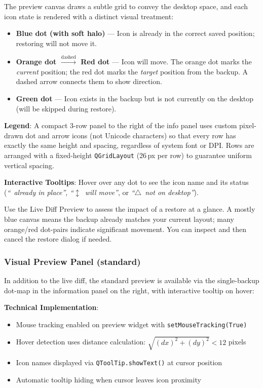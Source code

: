 \documentclass[a4paper,11pt]{article}
\begin{document}
The preview canvas draws a subtle grid to convey the desktop space,
and each icon state is rendered with a distinct visual treatment:

\begin{itemize}
  \item \textbf{\textcolor{primary}{Blue dot} (with soft halo)} ---
    Icon is already in the correct saved position; restoring will not move it.
  \item \textbf{Orange dot $\xrightarrow{\text{dashed}}$ Red dot} ---
    Icon will move.  The orange dot marks the \textit{current} position;
    the red dot marks the \textit{target} position from the backup.
    A dashed arrow connects them to show direction.
  \item \textbf{\textcolor{success}{Green dot}} ---
    Icon exists in the backup but is not currently on the desktop
    (will be skipped during restore).
\end{itemize}

\textbf{Legend}: A compact 3-row panel to the right of the info panel
uses custom pixel-drawn dot and arrow icons (not Unicode characters) so
that every row has exactly the same height and spacing, regardless of
system font or DPI.  Rows are arranged with a fixed-height
\texttt{QGridLayout} (26\,px per row) to guarantee uniform vertical
spacing.

\textbf{Interactive Tooltips}: Hover over any dot to see the icon name
and its status (\textit{``\checkmark\ already in place''},
  \textit{``$\updownarrow$\ will move''},
or \textit{``$\triangle$\ not on desktop''}).

\begin{infobox}
  Use the Live Diff Preview to assess the impact of a restore at a
  glance.  A mostly blue canvas means the backup already matches your
  current layout; many orange/red dot-pairs indicate significant
  movement.  You can inspect and then cancel the restore dialog if needed.
\end{infobox}

\subsubsection{Visual Preview Panel (standard)}

In addition to the live diff, the standard preview is available via the
single-backup dot-map in the information panel on the right, with
interactive tooltip on hover:

\textbf{Technical Implementation}:
\begin{itemize}
  \item Mouse tracking enabled on preview widget with
    \texttt{setMouseTracking(True)}
  \item Hover detection uses distance calculation: $\sqrt{(dx)^2 +
    (dy)^2} < 12$ pixels
  \item Icon names displayed via \texttt{QToolTip.showText()} at cursor position
  \item Automatic tooltip hiding when cursor leaves icon proximity
\end{itemize}
\end{document}
